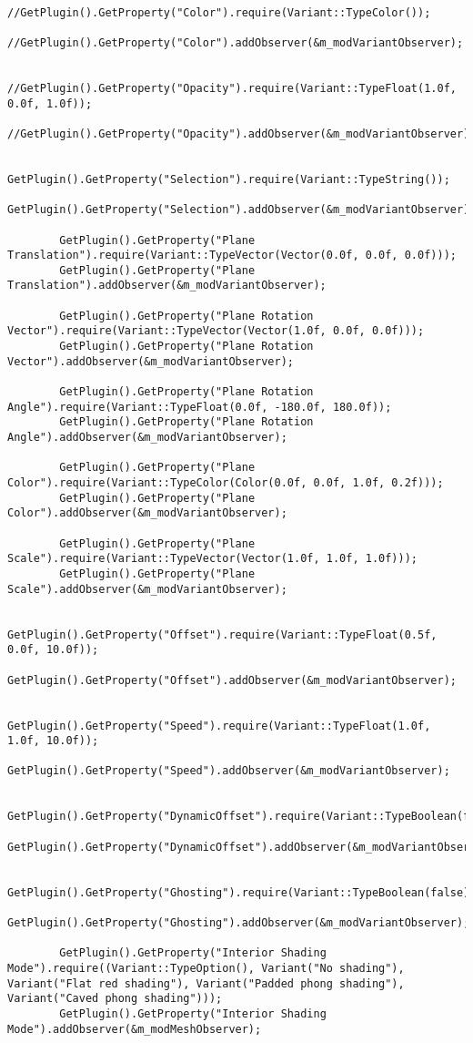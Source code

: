 \begin{verbatim}
		//GetPlugin().GetProperty("Color").require(Variant::TypeColor());
		//GetPlugin().GetProperty("Color").addObserver(&m_modVariantObserver);

		//GetPlugin().GetProperty("Opacity").require(Variant::TypeFloat(1.0f, 0.0f, 1.0f));
		//GetPlugin().GetProperty("Opacity").addObserver(&m_modVariantObserver);

		GetPlugin().GetProperty("Selection").require(Variant::TypeString());
		GetPlugin().GetProperty("Selection").addObserver(&m_modVariantObserver);

		GetPlugin().GetProperty("Plane Translation").require(Variant::TypeVector(Vector(0.0f, 0.0f, 0.0f)));
		GetPlugin().GetProperty("Plane Translation").addObserver(&m_modVariantObserver);

		GetPlugin().GetProperty("Plane Rotation Vector").require(Variant::TypeVector(Vector(1.0f, 0.0f, 0.0f)));
		GetPlugin().GetProperty("Plane Rotation Vector").addObserver(&m_modVariantObserver);

		GetPlugin().GetProperty("Plane Rotation Angle").require(Variant::TypeFloat(0.0f, -180.0f, 180.0f));
		GetPlugin().GetProperty("Plane Rotation Angle").addObserver(&m_modVariantObserver);

		GetPlugin().GetProperty("Plane Color").require(Variant::TypeColor(Color(0.0f, 0.0f, 1.0f, 0.2f)));
		GetPlugin().GetProperty("Plane Color").addObserver(&m_modVariantObserver);

		GetPlugin().GetProperty("Plane Scale").require(Variant::TypeVector(Vector(1.0f, 1.0f, 1.0f)));
		GetPlugin().GetProperty("Plane Scale").addObserver(&m_modVariantObserver);

		GetPlugin().GetProperty("Offset").require(Variant::TypeFloat(0.5f, 0.0f, 10.0f));
		GetPlugin().GetProperty("Offset").addObserver(&m_modVariantObserver);

		GetPlugin().GetProperty("Speed").require(Variant::TypeFloat(1.0f, 1.0f, 10.0f));
		GetPlugin().GetProperty("Speed").addObserver(&m_modVariantObserver);

		GetPlugin().GetProperty("DynamicOffset").require(Variant::TypeBoolean(false));
		GetPlugin().GetProperty("DynamicOffset").addObserver(&m_modVariantObserver);

		GetPlugin().GetProperty("Ghosting").require(Variant::TypeBoolean(false));
		GetPlugin().GetProperty("Ghosting").addObserver(&m_modVariantObserver);

		GetPlugin().GetProperty("Interior Shading Mode").require((Variant::TypeOption(), Variant("No shading"), Variant("Flat red shading"), Variant("Padded phong shading"), Variant("Caved phong shading")));
		GetPlugin().GetProperty("Interior Shading Mode").addObserver(&m_modMeshObserver);


\end{verbatim}
